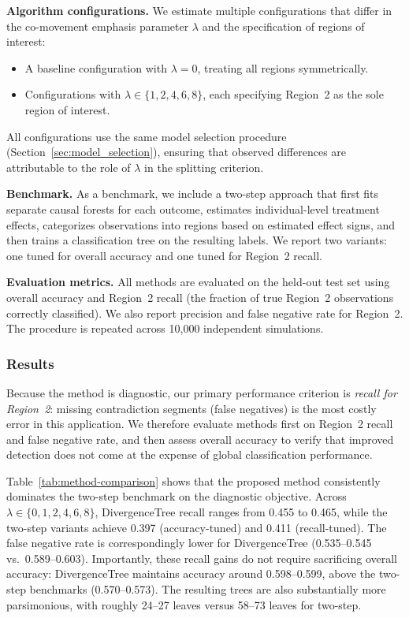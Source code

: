\documentclass[11pt,letterpaper,english]{article}
\theoremstyle{definition}
\theoremstyle{definition}
\begin{document}
\begin{bibunit}
\vspace{6pt}
\noindent
\textbf{Algorithm configurations.}
We estimate multiple configurations that differ in the co-movement emphasis parameter $\lambda$ and the specification of regions of interest:
\begin{itemize}[leftmargin=2em]
    \item A baseline configuration with $\lambda = 0$, treating all regions symmetrically.
    \item Configurations with $\lambda \in \{1, 2, 4, 6, 8\}$, each specifying Region~2 as the sole region of interest.
\end{itemize}
All configurations use the same model selection procedure (Section~\ref{sec:model_selection}), ensuring that observed differences are attributable to the role of $\lambda$ in the splitting criterion.

\vspace{6pt}
\noindent
\textbf{Benchmark.}
As a benchmark, we include a two-step approach that first fits separate causal forests for each outcome, estimates individual-level treatment effects, categorizes observations into regions based on estimated effect signs, and then trains a classification tree on the resulting labels. We report two variants: one tuned for overall accuracy and one tuned for Region~2 recall.

\vspace{6pt}
\noindent
\textbf{Evaluation metrics.}
All methods are evaluated on the held-out test set using overall accuracy and Region~2 recall (the fraction of true Region~2 observations correctly classified). We also report precision and false negative rate for Region~2. The procedure is repeated across 10{,}000 independent simulations.

\subsubsection{Results}
\label{sec:results}

Because the method is diagnostic, our primary performance criterion is \emph{recall for Region~2}: missing contradiction segments (false negatives) is the most costly error in this application. We therefore evaluate methods first on Region~2 recall and false negative rate, and then assess overall accuracy to verify that improved detection does not come at the expense of global classification performance.



Table~\ref{tab:method-comparison} shows that the proposed method consistently dominates the two-step benchmark on the diagnostic objective. Across $\lambda \in \{0,1,2,4,6,8\}$, DivergenceTree recall ranges from 0.455 to 0.465, while the two-step variants achieve 0.397 (accuracy-tuned) and 0.411 (recall-tuned). The false negative rate is correspondingly lower for DivergenceTree (0.535--0.545 vs.\ 0.589--0.603). Importantly, these recall gains do not require sacrificing overall accuracy: DivergenceTree maintains accuracy around 0.598--0.599, above the two-step benchmarks (0.570--0.573). The resulting trees are also substantially more parsimonious, with roughly 24--27 leaves versus 58--73 leaves for two-step.


\end{bibunit}
\end{document}
